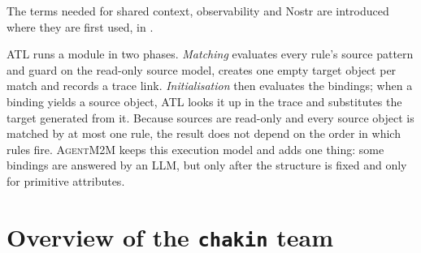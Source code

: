\documentclass[10pt,a4paper]{article}
\newcommand{\tool}{\textsc{AgentM2M}}
\theoremstyle{definition}
\begin{document}
The terms needed for shared context, observability and Nostr are
introduced where they are first used, in .

ATL runs a module in two phases. \emph{Matching} evaluates every rule's source
pattern and guard on the read-only source model, creates one empty target
object per match and records a trace link. \emph{Initialisation} then
evaluates the bindings; when a binding yields a source object, ATL looks it up
in the trace and substitutes the target generated from it. Because sources
are read-only and every source object is matched by at most one rule, the
result does not depend on the order in which rules fire. \tool{} keeps this
execution model and adds one thing: some bindings are answered by an LLM, but
only after the structure is fixed and only for primitive attributes.

\section{Overview of the \texttt{chakin} team}\label{sec:overview}
\end{document}

